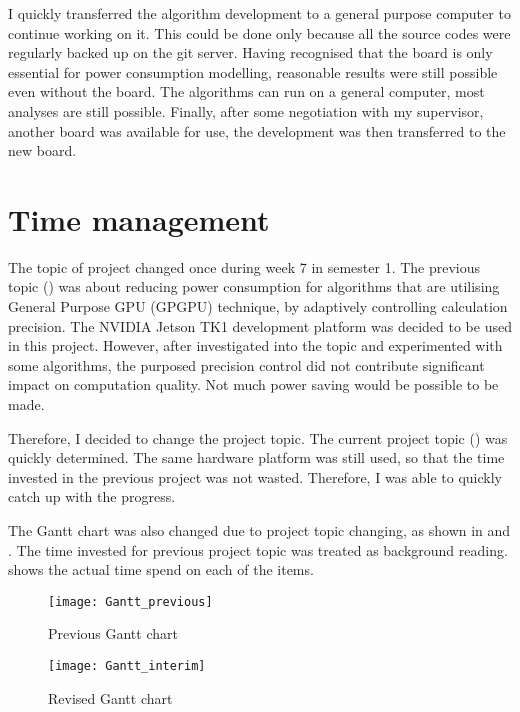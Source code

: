 I quickly transferred the algorithm development to a general purpose computer to continue working on it. This could be done only because all the source codes were regularly backed up on the git server. Having recognised that the board is only essential for power consumption modelling, reasonable results were still possible even without the board. The algorithms can run on a general computer, most analyses are still possible. Finally, after some negotiation with my supervisor, another board was available for use, the development was then transferred to the new board.

\section{Time management}

The topic of project changed once during week 7 in semester 1. The previous topic () was about reducing power consumption for algorithms that are utilising General Purpose GPU (GPGPU) technique, by adaptively controlling calculation precision. The NVIDIA Jetson TK1 development platform was decided to be used in this project. However, after investigated into the topic and experimented with some algorithms, the purposed precision control did not contribute significant impact on computation quality. Not much power saving would be possible to be made.

Therefore, I decided to change the project topic. The current project topic () was quickly determined. The same hardware platform was still used, so that the time invested in the previous project was not wasted. Therefore, I was able to quickly catch up with the progress.

The Gantt chart was also changed due to project topic changing, as shown in  and . The time invested for previous project topic was treated as background reading.  shows the actual time spend on each of the items.

\begin{figure}[H]
  \centering
  \texttt{[image: Gantt\_previous]}
  \caption{Previous Gantt chart}
  \label{gantt_prev}
\end{figure}

\begin{figure}[H]
  \centering
  \texttt{[image: Gantt\_interim]}
  \caption{Revised Gantt chart}
  \label{gantt_rev}
\end{figure}


